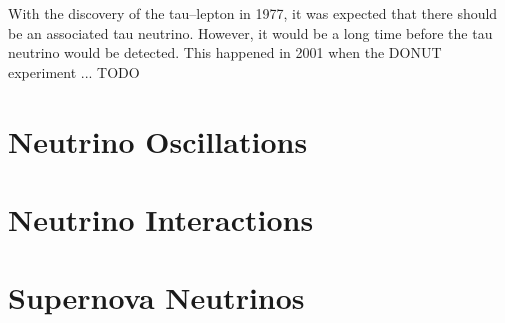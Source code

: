 With the discovery of the tau--lepton in 1977, it was expected that there 
should be an associated tau neutrino. However, it would be a long time before
the tau neutrino would be detected. This happened in 2001 when the DONUT
experiment ... TODO





\section{Neutrino Oscillations} \label{nu_osc}

\section{Neutrino Interactions} \label{nu_prod}

\section{Supernova Neutrinos} \label{nu_sn}
